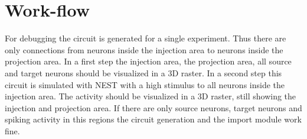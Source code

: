 \documentclass[a4paper]{IEEEtran}
\begin{document}
   \section{Work-flow}
   For debugging the circuit is generated for a single experiment. Thus there are only connections
   from neurons inside the injection area to neurons inside the projection area. In a first step the injection area, the projection area, all source and target neurons should be visualized in a 3D raster. In a second step this circuit is simulated with NEST with a high stimulus to all neurons inside the injection area. The activity should be visualized in a 3D raster, still showing the injection and projection area. If there are only source neurons, target neurons and  spiking activity in this regions the circuit generation and the import module work fine.
   
   
	
	
	
\end{document}
